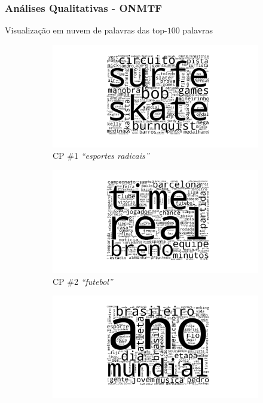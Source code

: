 \documentclass[10pt]{beamer}
\begin{document}

\begin{frame} [shrink=15]
\frametitle{Análises Qualitativas - ONMTF}

  Visualização em nuvem de palavras das top-$100$ palavras
  \begin{figure}[H]
  \centering
      \begin{subfigure}[b]{0.45\textwidth}
          \includegraphics[width=\textwidth]{img/onmtf-tc-1.png}
          \caption{CP \#1 \textit{``esportes radicais''}}
      \end{subfigure}
      \begin{subfigure}[b]{0.45\textwidth}
          \includegraphics[width=\textwidth]{img/onmtf-tc-2.png}
          \caption{CP \#2 \textit{``futebol''}}
      \end{subfigure}
      \begin{subfigure}[b]{0.45\textwidth}
          \includegraphics[width=\textwidth]{img/onmtf-tc-3.png}

\end{subfigure}
\end{figure}
\end{frame}
\end{document}
